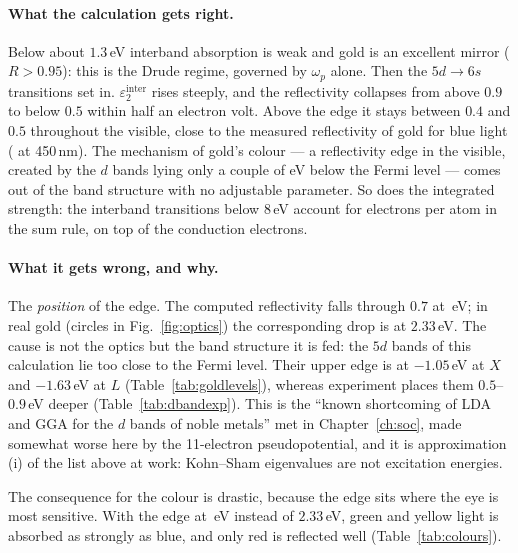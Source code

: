 \paragraph{What the calculation gets right.} Below about $1.3$\,eV
interband absorption is weak and gold is an excellent mirror
($R > 0.95$): this is the Drude regime, governed by $\omega_p$ alone.
Then the $5d\to6s$ transitions set in. $\varepsilon_2^{\mathrm{inter}}$
rises steeply, and the reflectivity collapses from above $0.9$ to below
$0.5$ within half an electron volt. Above the edge it stays between
$0.4$ and $0.5$ throughout the visible, close to the measured reflectivity
of gold for blue light (\REXPb{} at 450\,nm). The mechanism of gold's colour ---
a reflectivity edge in the visible, created by the $d$ bands lying only a
couple of eV below the Fermi level --- comes out of the band structure
with no adjustable parameter. So does the integrated strength: the
interband transitions below 8\,eV account for \NEFFINTER{} electrons per
atom in the sum rule, on top of the \NEFF{} conduction electrons.

\paragraph{What it gets wrong, and why.} The \emph{position} of the edge.
The computed reflectivity falls through $0.7$ at \EDGE\,eV; in real gold
(circles in Fig.~\ref{fig:optics}) the corresponding drop is at
$2.33$\,eV. The cause is not the
optics but the band structure it is fed: the $5d$ bands of this
calculation lie too close to the Fermi level. Their upper edge is at
$-1.05$\,eV at $X$ and $-1.63$\,eV at $L$ (Table~\ref{tab:goldlevels}),
whereas experiment places them $0.5$--$0.9$\,eV deeper
(Table~\ref{tab:dbandexp}). This is the ``known shortcoming of LDA
and GGA for the $d$ bands of noble metals'' met in
Chapter~\ref{ch:soc}, made somewhat worse here by the 11-electron
pseudopotential, and it is approximation (i) of the list above at work:
Kohn--Sham eigenvalues are not excitation energies.

The consequence for the colour is drastic, because the edge sits where the
eye is most sensitive. With the edge at \EDGE\,eV instead of $2.33$\,eV,
green and yellow light is absorbed as strongly as blue, and only red is
reflected well (Table~\ref{tab:colours}).


